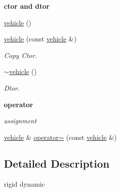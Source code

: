 \begin{Indent}{\bf ctor and dtor}\par
{\em \label{_amgrp98fbd3e5ae66fcd014fb744fec76c58d}
 }\begin{DoxyCompactItemize}
\item 
\hyperlink{classnebula_1_1content_1_1actor_1_1physics_1_1physx_1_1vehicle_a9a55030c4dab2fd9cdff37534685827d}{vehicle} ()
\item 
\hyperlink{classnebula_1_1content_1_1actor_1_1physics_1_1physx_1_1vehicle_ade813048c13ef94a737be799b483bddd}{vehicle} (const \hyperlink{classnebula_1_1content_1_1actor_1_1physics_1_1physx_1_1vehicle}{vehicle} \&)
\begin{DoxyCompactList}\small\item\em Copy Ctor. \item\end{DoxyCompactList}\item 
\hyperlink{classnebula_1_1content_1_1actor_1_1physics_1_1physx_1_1vehicle_a4a78a78751e0a35e62826e50f18b4e16}{$\sim$vehicle} ()
\begin{DoxyCompactList}\small\item\em Dtor. \item\end{DoxyCompactList}\end{DoxyCompactItemize}
\end{Indent}
\begin{Indent}{\bf operator}\par
{\em \label{_amgrp4b583376b2767b923c3e1da60d10de59}
 assignment }\begin{DoxyCompactItemize}
\item 
\hyperlink{classnebula_1_1content_1_1actor_1_1physics_1_1physx_1_1vehicle}{vehicle} \& \hyperlink{classnebula_1_1content_1_1actor_1_1physics_1_1physx_1_1vehicle_a84650bfdbbff5bb3bb98cd049738531b}{operator=} (const \hyperlink{classnebula_1_1content_1_1actor_1_1physics_1_1physx_1_1vehicle}{vehicle} \&)
\end{DoxyCompactItemize}
\end{Indent}


\subsection{Detailed Description}
rigid dynamic 

